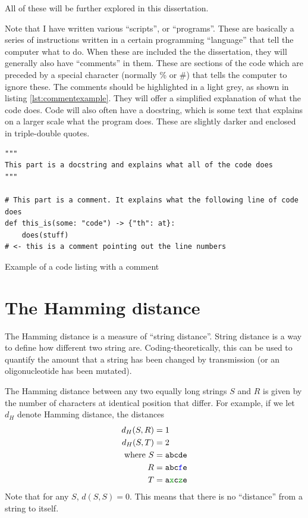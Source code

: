 \documentclass[11pt]{article}
\newenvironment{longlisting}
{\addvspace{\baselineskip}\captionsetup{type=listing}}
{\addvspace{\baselineskip}}
\begin{document}
    All of these will be further explored in this dissertation.

    Note that I have written various ``scripts'', or ``programs''. These are
    basically a series of instructions written in a certain programming
    ``language'' that tell the computer what to do. When these are included the
    the dissertation, they will generally also have ``comments'' in them. These
    are sections of the code which are preceded by a special character (normally
    \% or \#) that tells the computer to ignore these. The comments should be
    highlighted in a light grey, as shown in listing \ref{lst:commentexample}.
    They will offer a simplified explanation of what the code does. Code will
    also often have a docstring, which is some text that explains on a larger
    scale what the program does. These are slightly darker and enclosed in
    triple-double quotes.

\begin{longlisting}
\begin{verbatim}
"""
This part is a docstring and explains what all of the code does
"""

# This part is a comment. It explains what the following line of code does
def this_is(some: "code") -> {"th": at}:
    does(stuff)
# <- this is a comment pointing out the line numbers
\end{verbatim}
\caption{Example of a code listing with a comment}\label{lst:commentexample}
\end{longlisting}

    \section{The Hamming distance}

    The Hamming distance is a measure of ``string distance''. String
    distance is a way to define how different two string are.
    Coding-theoretically, this can be used to quantify the amount that a
    string has been changed by transmission (or an oligonucleotide has been
    mutated).

    The Hamming distance between any two equally long strings $S$ and $R$
    is given by the number of characters at identical position that differ.
    For example, if we let $d_H$ denote Hamming distance, the distances
    \begin{align*}
    d_H(S, R) &= 1\\
    d_H(S, T) &= 2\\
    \text{where}\
    S &= \texttt{abcde}\\
    R &= \texttt{abc\textcolor{blue}{f}e}\\
    T &= \texttt{a\textcolor{codegreen}{x}c\textcolor{codegreen}{z}e}
    \end{align*}
    Note that for any $S$, $d(S, S) = 0$. This means that there is no
    ``distance'' from a string to itself.
\end{document}
